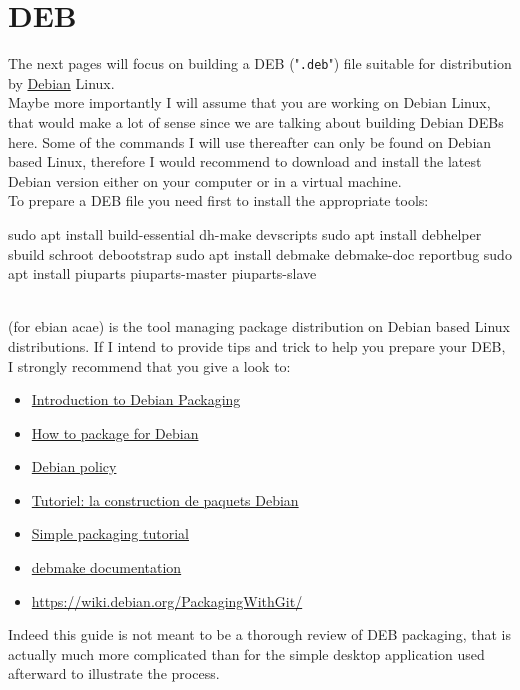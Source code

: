 \section{DEB}

\newcommand{\ddir}{"\bftt{debian}" directory}
\newcommand{\dpkg}{"\bftt{dpkg}" command}

The next pages will focus on building a DEB ("\texttt{.deb}") file suitable for distribution by \href{https://www.debian.org}{Debian} Linux. \\[0.25cm]
Maybe more importantly I will assume that you are working on Debian Linux, that would make
a lot of sense since we are talking about building Debian DEBs here. Some of the commands
I will use thereafter can only be found on Debian based Linux, therefore I would recommend to download
and install the latest Debian version either on your computer or in a virtual machine. \\[0.25cm]
To prepare a DEB file you need first to install the appropriate tools:
{\small{
\begin{script}
\uprompt{~} sudo apt install build-essential dh-make devscripts 
\uprompt{~} sudo apt install debhelper sbuild schroot debootstrap
\uprompt{~} sudo apt install debmake debmake-doc reportbug 
\uprompt{~} sudo apt install piuparts piuparts-master piuparts-slave
\end{script}
}}
\\[-0.25cm]
\noindent {} (for ebian acae) is the tool managing package distribution on Debian based Linux distributions. 
If I intend to provide tips and trick to help you prepare your DEB, I strongly recommend that you give a look to:
\begin{itemize}
\item \href{https://wiki.debian.org/Packaging/Intro?action=show\&redirect=IntroDebianPackaging}{Introduction to Debian Packaging}
\item \href{https://wiki.debian.org/HowToPackageForDebian}{How to package for Debian}
\item \href{https://www.debian.org/doc/debian-policy/}{Debian policy}
\item \href{https://www.debian.org/doc/manuals/packaging-tutorial/packaging-tutorial.fr.pdf}{Tutoriel: la construction de paquets Debian}
\item \href{https://wiki.debian.org/SimplePackagingTutorial}{Simple packaging tutorial}
\item \href{file://usr/share/doc/debmake-doc/}{debmake documentation}
\item \href{https://wiki.debian.org/PackagingWithGit/}{https://wiki.debian.org/PackagingWithGit/}
\end{itemize}
Indeed this guide is not meant to be a thorough review of DEB packaging, that is actually
much more complicated than for the simple desktop application used afterward to illustrate the process.

